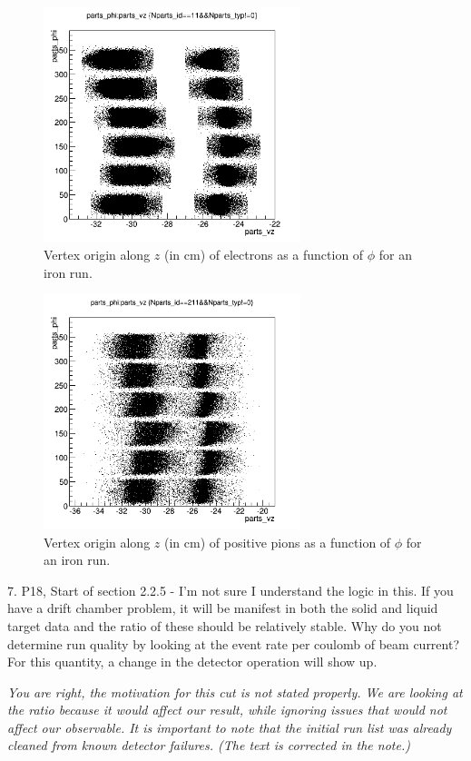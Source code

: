 \documentclass[12pt]{article}
\begin{document}
\begin{figure}[tbp]
\centering
\includegraphics[width=7.5cm] {answer-fig/VertexElFe.png} 
\caption {Vertex origin along $z$ (in cm) of electrons as a function of $\phi$ 
for an iron run.}
\label{VertexEl}
\end{figure}

\begin{figure}[tbp]
\centering
\includegraphics[width=7.5cm] {answer-fig/VertexPipFe.png} 
\caption {Vertex origin along $z$ (in cm) of positive pions as a function of $\phi$ 
for an iron run.}
\label{VertexPip}
\end{figure}

7.
P18, Start of section 2.2.5 - I’m not sure I understand the logic in this.  If you have a drift 
chamber problem, it will be manifest in both the solid and liquid target data and the ratio of 
these should be relatively stable.  Why do you not determine run quality by looking at the 
event rate per coulomb of beam current?  For this quantity, a change in the detector 
operation will show up.

{\it You are right, the motivation for this cut is not stated properly. We are looking 
at the ratio because it would affect our result, while ignoring issues that would not
affect our observable. It is important to note that the initial run list was already
cleaned from known detector failures. (The text is corrected in the note.) }
\end{document}
